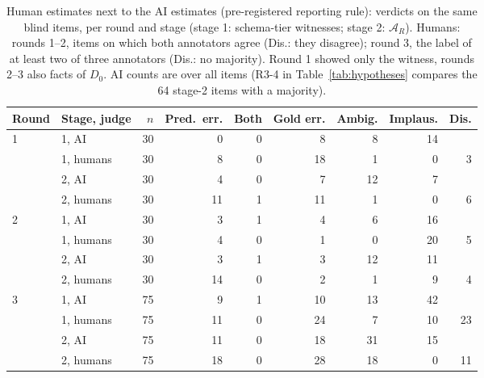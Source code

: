 \begin{table}[t]
\centering\scriptsize
\caption{Human estimates next to the AI estimates (pre-registered reporting rule): verdicts on the same blind items, per round and stage (stage 1: schema-tier witnesses; stage 2: $\mathcal A_R$). Humans: rounds 1--2, items on which both annotators agree (Dis.: they disagree); round 3, the label of at least two of three annotators (Dis.: no majority). Round 1 showed only the witness, rounds 2--3 also facts of $D_0$. AI counts are over all items (R3-4 in Table~\ref{tab:hypotheses} compares the 64 stage-2 items with a majority).}\label{tab:humanai}
\setlength{\tabcolsep}{3pt}
\begin{tabular}{@{}llrrrrrrr@{}}
\toprule
Round & Stage, judge & $n$ & Pred.\ err. & Both & Gold err. & Ambig. & Implaus. & Dis.\\
\midrule
1 & 1, AI & 30 & 0 & 0 & 8 & 8 & 14 & \\
 & 1, humans & 30 & 8 & 0 & 18 & 1 & 0 & 3\\
\addlinespace[1pt]
 & 2, AI & 30 & 4 & 0 & 7 & 12 & 7 & \\
 & 2, humans & 30 & 11 & 1 & 11 & 1 & 0 & 6\\
\midrule
2 & 1, AI & 30 & 3 & 1 & 4 & 6 & 16 & \\
 & 1, humans & 30 & 4 & 0 & 1 & 0 & 20 & 5\\
\addlinespace[1pt]
 & 2, AI & 30 & 3 & 1 & 3 & 12 & 11 & \\
 & 2, humans & 30 & 14 & 0 & 2 & 1 & 9 & 4\\
\midrule
3 & 1, AI & 75 & 9 & 1 & 10 & 13 & 42 & \\
 & 1, humans & 75 & 11 & 0 & 24 & 7 & 10 & 23\\
\addlinespace[1pt]
 & 2, AI & 75 & 11 & 0 & 18 & 31 & 15 & \\
 & 2, humans & 75 & 18 & 0 & 28 & 18 & 0 & 11\\
\bottomrule
\end{tabular}
\end{table}
